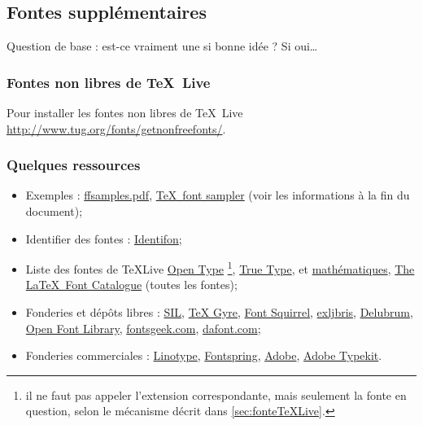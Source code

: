 \subsection{Fontes supplémentaires}

Question de base : est-ce vraiment une si bonne idée ? Si oui\dots


\subsubsection{Fontes non libres de \TeX \ Live}

Pour installer les fontes non libres de \TeX \ Live \url{http://www.tug.org/fonts/getnonfreefonts/}.


\subsubsection{Quelques ressources}

\begin{itemize}
	\item Exemples :
		\href{http://www.math.ucsd.edu/~msharpe/ffsamples.pdf}{ffsamples.pdf},
		\href{http://www.tug.org/fonts/special-s.pdf}{\TeX \ font sampler} (voir les informations à la fin du document);
	\item Identifier des fontes :
		\href{http://www.identifont.com/similar.html}{Identifon};
	\item Liste des fontes de \TeX Live
		\href{https://www.ctan.org/topic/font-otf}{Open Type}
			\footnote{\label{foot:fontePackage} \attention il ne faut pas appeler l'extension correspondante, mais seulement la fonte en question, selon le mécanisme décrit dans \ref{sec:fonteTeXLive}.},
		\href{https://www.ctan.org/topic/font-ttf}{True Type}, et
		\href{https://www.ctan.org/topic/font-maths}{mathématiques},
		\href{http://www.tug.dk/FontCatalogue/}{The \LaTeX \ Font Catalogue} (toutes les fontes);
	\item Fonderies et dépôts libres :
		\href{http://www.sil.org/resources/software_fonts}{SIL}, \href{http://www.gust.org.pl/projects/e-foundry/tex-gyre/}{TeX Gyre},
		\href{http://www.fontsquirrel.com}{Font Squirrel},
		\href{http://www.exljbris.com}{exljbris},
		\href{http://delubrum.org/}{Delubrum},
		\href{https://fontlibrary.org/}{Open Font Library},
		\href{http://fontsgeek.com}{fontsgeek.com},
		\href{http://www.dafont.com/fr/}{dafont.com};
	\item Fonderies commerciales :
		\href{http://www.linotype.com/fr/}{Linotype},
		\href{http://www.fontspring.com}{Fontspring},
		\href{http://www.adobe.com/products/type/fonts-by-adobe.html}{Adobe},
		\href{https://typekit.com}{Adobe Typekit}.
\end{itemize}





